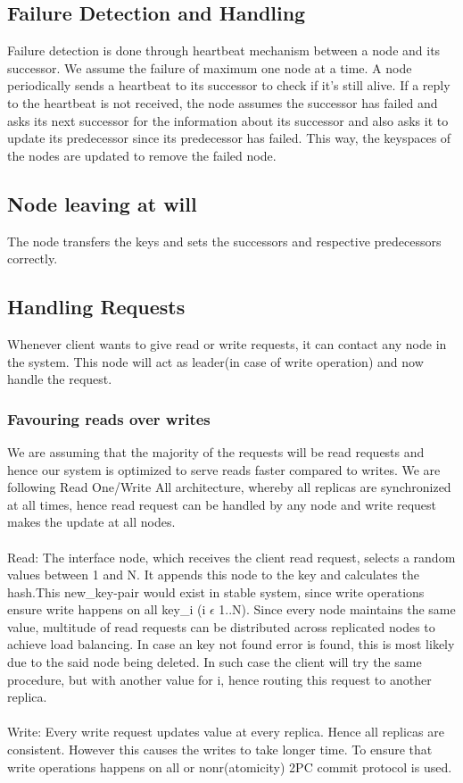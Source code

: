 \documentclass{article}
\begin{document}
\subsection{Failure Detection and Handling}
Failure detection is done through heartbeat mechanism between a node and its successor. We assume the failure of maximum one node at a time. A node periodically sends a heartbeat to its successor to check if it's still alive. If a reply to the heartbeat is not received, the node assumes the successor has failed and asks its next successor for the information about its successor and also asks it to update its predecessor since its predecessor has failed. This way, the keyspaces of the nodes are updated to remove the failed node.

\subsection{Node leaving at will}
The node transfers the keys and sets the successors and respective predecessors correctly.

\subsection{Handling Requests}
Whenever client wants to give read or write requests, it can contact any node in the system. This node will act as leader(in case of write operation) and now handle the request.

\subsubsection{Favouring reads over writes}
We are assuming that the majority of the requests will be read requests and hence our system is optimized to serve reads faster compared to writes. We are following Read One/Write All architecture, whereby all replicas are synchronized at all times, hence read request can be handled by any node and write request makes the update at all nodes. \\ \\
Read: The interface node, which receives the client read request, selects a random values between 1 and N. It appends this node to the key and calculates the hash.This new\_key-pair would exist in stable system, since write operations ensure write happens on all key\_i (i $\epsilon$ 1..N). Since every node maintains the same value, multitude of read requests can be distributed across replicated nodes to achieve load balancing. In case an key not found error is found, this is most likely due to the said node being deleted. In such case the client will try the same procedure, but with another value for i, hence routing this request to another replica.\\ \\
Write: Every write request updates value at every replica. Hence all replicas are consistent. However this causes the writes to take longer time. To ensure that write operations happens on all or nonr(atomicity) 2PC commit protocol is used.  \\
\end{document}
